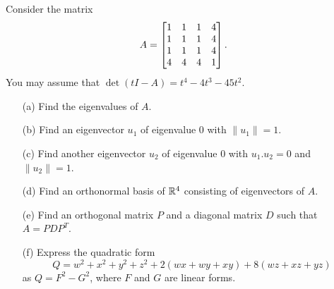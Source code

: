 \documentclass[a4paper]{article}
\begin{document}
\begin{problem}[2011-12 resit]
 Consider the matrix
 \[ A = \left[\begin{matrix} 1&1&1&4 \\ 1&1&1&4 \\ 1&1&1&4 \\ 4&4&4&1 \end{matrix}\right]. \]
 You may assume that $\det(tI-A)=t^4-4t^3-45t^2$.
 \begin{itemize}
  \item[(a)] Find the eigenvalues of $A$. 
  \item[(b)] Find an eigenvector $u_1$ of eigenvalue $0$ with
   $\|u_1\|=1$.  
  \item[(c)] Find another eigenvector $u_2$ of eigenvalue $0$ with
   $u_1.u_2=0$ and $\|u_2\|=1$.  
  \item[(d)] Find an orthonormal basis of ${\mathbb{R}}^4$ consisting of
   eigenvectors of $A$. 
  \item[(e)] Find an orthogonal matrix $P$ and a diagonal matrix $D$
   such that $A=PDP^T$. 
  \item[(f)] Express the quadratic form
   \[ Q = w^2+x^2+y^2+z^2 + 2(wx+wy+xy) + 8(wz+xz+yz) \] 
   as $Q=F^2-G^2$, where $F$ and $G$ are linear forms.  
 \end{itemize}
\end{problem}
\end{document}
